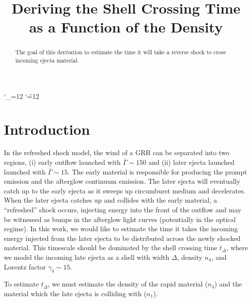 \documentclass[linenumbers,twocolumn]{aastex631}
\def\upsubscripts{\catcode`\_=12 } \def\normalsubscripts{\catcode`\_=8 }
\def\upsupscripts{\catcode`\^=12 } \def\normalsupscripts{\catcode`\^=7 }
\begin{document}
\upsubscripts
\upsupscripts

\title{Deriving the Shell Crossing Time as a Function of the Density}


\begin{abstract}
The goal of this derivation to estimate the time it will take a reverse shock to cross incoming ejecta material.

\end{abstract}

\section{Introduction}
{
    In the refreshed shock model, the wind of a GRB can be separated into two regions, (i) early outflow launched with $\bar{\Gamma}\sim150$ and (ii) later ejecta launched launched with $\bar{\Gamma}\sim15$. The early material is responsible for producing the prompt emission and the afterglow continuum emission. The later ejecta will eventually catch up to the early ejecta as it sweeps up circumburst medium and decelerates. When the later ejecta catches up and collides with the early material, a ``refreshed'' shock occurs, injecting energy into the front of the outflow and may be witnessed as bumps in the afterglow light curves (potentially in the optical regime). In this work, we would like to estimate the time it takes the incoming energy injected from the later ejecta to be distributed across the newly shocked material. This timescale should be dominated by the shell crossing time $t_{\Delta }$, where we model the incoming late ejecta as a shell with width $\Delta$, density $n_4$, and Lorentz factor $\gamma_{4}\sim15$. 

    To estimate $t_{\Delta}$, we must estimate the density of the rapid material ($n_4$) and the material which the late ejecta is colliding with ($n_1$).
}
\end{document}
